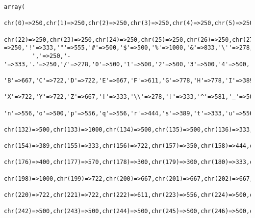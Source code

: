 \footnotesize\begin{verbatim}array(
        chr(0)=>250,chr(1)=>250,chr(2)=>250,chr(3)=>250,chr(4)=>250,chr(5)=>250,chr(6)=>250,chr(7)=>250,chr(8)=>250,chr(9)=>250,chr(10)=>250,chr(11)=>250,chr(12)=>250,chr(13)=>250,chr(14)=>250,chr(15)=>250,chr(16)=>250,chr(17)=>250,chr(18)=>250,chr(19)=>250,chr(20)=>250,chr(21)=>250,
        chr(22)=>250,chr(23)=>250,chr(24)=>250,chr(25)=>250,chr(26)=>250,chr(27)=>250,chr(28)=>250,chr(29)=>250,chr(30)=>250,chr(31)=>250, =>250,'!'=>333,'"'=>555,'#'=>500,'$'=>500,'%'=>1000,'&'=>833,'\''=>278,'('=>333,')'=>333,'*'=>500,'+'=>570,
        ','=>250,'-'=>333,'.'=>250,'/'=>278,'0'=>500,'1'=>500,'2'=>500,'3'=>500,'4'=>500,'5'=>500,'6'=>500,'7'=>500,'8'=>500,'9'=>500,':'=>333,';'=>333,'<'=>570,'='=>570,'>'=>570,'?'=>500,'@'=>930,'A'=>722,
        'B'=>667,'C'=>722,'D'=>722,'E'=>667,'F'=>611,'G'=>778,'H'=>778,'I'=>389,'J'=>500,'K'=>778,'L'=>667,'M'=>944,'N'=>722,'O'=>778,'P'=>611,'Q'=>778,'R'=>722,'S'=>556,'T'=>667,'U'=>722,'V'=>722,'W'=>1000,
        'X'=>722,'Y'=>722,'Z'=>667,'['=>333,'\\'=>278,']'=>333,'^'=>581,'_'=>500,'`'=>333,'a'=>500,'b'=>556,'c'=>444,'d'=>556,'e'=>444,'f'=>333,'g'=>500,'h'=>556,'i'=>278,'j'=>333,'k'=>556,'l'=>278,'m'=>833,
        'n'=>556,'o'=>500,'p'=>556,'q'=>556,'r'=>444,'s'=>389,'t'=>333,'u'=>556,'v'=>500,'w'=>722,'x'=>500,'y'=>500,'z'=>444,'{'=>394,'|'=>220,'}'=>394,'~'=>520,chr(127)=>350,chr(128)=>500,chr(129)=>350,chr(130)=>333,chr(131)=>500,
        chr(132)=>500,chr(133)=>1000,chr(134)=>500,chr(135)=>500,chr(136)=>333,chr(137)=>1000,chr(138)=>556,chr(139)=>333,chr(140)=>1000,chr(141)=>350,chr(142)=>667,chr(143)=>350,chr(144)=>350,chr(145)=>333,chr(146)=>333,chr(147)=>500,chr(148)=>500,chr(149)=>350,chr(150)=>500,chr(151)=>1000,chr(152)=>333,chr(153)=>1000,
        chr(154)=>389,chr(155)=>333,chr(156)=>722,chr(157)=>350,chr(158)=>444,chr(159)=>722,chr(160)=>250,chr(161)=>333,chr(162)=>500,chr(163)=>500,chr(164)=>500,chr(165)=>500,chr(166)=>220,chr(167)=>500,chr(168)=>333,chr(169)=>747,chr(170)=>300,chr(171)=>500,chr(172)=>570,chr(173)=>333,chr(174)=>747,chr(175)=>333,
        chr(176)=>400,chr(177)=>570,chr(178)=>300,chr(179)=>300,chr(180)=>333,chr(181)=>556,chr(182)=>540,chr(183)=>250,chr(184)=>333,chr(185)=>300,chr(186)=>330,chr(187)=>500,chr(188)=>750,chr(189)=>750,chr(190)=>750,chr(191)=>500,chr(192)=>722,chr(193)=>722,chr(194)=>722,chr(195)=>722,chr(196)=>722,chr(197)=>722,
        chr(198)=>1000,chr(199)=>722,chr(200)=>667,chr(201)=>667,chr(202)=>667,chr(203)=>667,chr(204)=>389,chr(205)=>389,chr(206)=>389,chr(207)=>389,chr(208)=>722,chr(209)=>722,chr(210)=>778,chr(211)=>778,chr(212)=>778,chr(213)=>778,chr(214)=>778,chr(215)=>570,chr(216)=>778,chr(217)=>722,chr(218)=>722,chr(219)=>722,
        chr(220)=>722,chr(221)=>722,chr(222)=>611,chr(223)=>556,chr(224)=>500,chr(225)=>500,chr(226)=>500,chr(227)=>500,chr(228)=>500,chr(229)=>500,chr(230)=>722,chr(231)=>444,chr(232)=>444,chr(233)=>444,chr(234)=>444,chr(235)=>444,chr(236)=>278,chr(237)=>278,chr(238)=>278,chr(239)=>278,chr(240)=>500,chr(241)=>556,
        chr(242)=>500,chr(243)=>500,chr(244)=>500,chr(245)=>500,chr(246)=>500,chr(247)=>570,chr(248)=>500,chr(249)=>556,chr(250)=>556,chr(251)=>556,chr(252)=>556,chr(253)=>500,chr(254)=>556,chr(255)=>500)
\end{verbatim}\normalsize 
